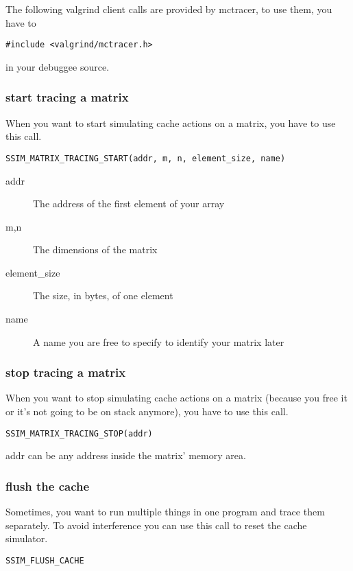 \lstset{language=C}

The following valgrind client calls are provided by mctracer, to use them, you have to
\begin{lstlisting}
#include <valgrind/mctracer.h>
\end{lstlisting}
in your debuggee source.

\subsubsection{start tracing a matrix}
When you want to start simulating cache actions on a matrix, you have to use this call.
\begin{lstlisting}
SSIM_MATRIX_TRACING_START(addr, m, n, element_size, name)
\end{lstlisting}
\begin{description}
\item[addr] The address of the first element of your array
\item[m,n] The dimensions of the matrix
\item[element\_size] The size, in bytes, of one element
\item[name] A name you are free to specify to identify your matrix later
\end{description}


\subsubsection{stop tracing a matrix}
When you want to stop simulating cache actions on a matrix (because you free it or it's not going to be on stack anymore), you have to use this call.
\begin{lstlisting}
SSIM_MATRIX_TRACING_STOP(addr)
\end{lstlisting}
addr can be any address inside the matrix' memory area.

\subsubsection{flush the cache}
Sometimes, you want to run multiple things in one program and trace them separately. To avoid interference you can use this call to reset the cache simulator.
\begin{lstlisting}
SSIM_FLUSH_CACHE
\end{lstlisting}

